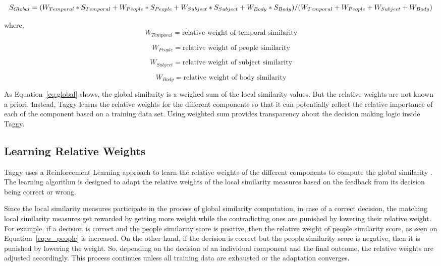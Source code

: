 \begin{equation}
	\label{eq:global}
S_{Global} = (W_{Temporal} * S_{Temporal} + W_{People} * S_{People} + W_{Subject} * S_{Subject} + W_{Body} * S_{Body}) / (W_{Temporal} + W_{People} + W_{Subject} + W_{Body})\\
\end{equation}

where,
\begin{equation}
	\label{eq:w_temporal}	
W_{Temporal} = \mbox{relative weight of temporal similarity}
\end{equation}      

\begin{equation}   
		\label{eq:w_people}
W_{People} = \mbox{relative weight of people similarity}
\end{equation}

\begin{equation}     
		\label{eq:w_subject}
W_{Subject} = \mbox{relative weight of subject similarity}
\end{equation}

\begin{equation}     
		\label{eq:w_body}
W_{Body} = \mbox{relative weight of body similarity}
\end{equation}

As Equation~\ref{eq:global} shows, the global similarity is a weighed sum of the local similarity values. But the relative weights are not known a priori. Instead, Taggy learns the relative weights for the different components so that it can potentially reflect the relative importance of each of the component based on a training data set. Using weighted sum provides transparency about the decision making logic inside Taggy.
	
\subsection{Learning Relative Weights}	
Taggy uses a Reinforcement Learning approach to learn the relative weights of the different components to compute the global similarity \cite{reinforcement_learning}. The learning algorithm is designed to adapt the relative weights of the local similarity measures based on the feedback from its decision being correct or wrong.

Since the local similarity measures participate in the process of global similarity computation, in case of a correct decision, the matching local similarity measures get rewarded by getting more weight while the contradicting ones are punished by lowering their relative weight. For example, if a decision is correct and the people similarity score is positive, then the relative weight of people similarity score, as seen on Equation~\ref{eq:w_people} is increased. On the other hand, if the decision is correct but the people similarity score is negative, then it is punished by lowering the weight. So, depending on the decision of an individual component and the final outcome, the relative weights are adjusted accordingly. This process continues unless all training data are exhausted or the adaptation converges.

